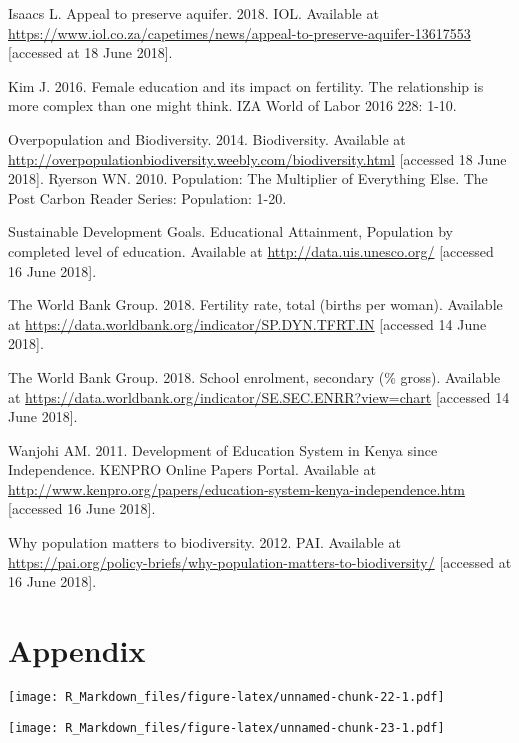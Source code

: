 \documentclass[11pt,]{article}
\begin{document}
Isaacs L. Appeal to preserve aquifer. 2018. IOL. Available at
\url{https://www.iol.co.za/capetimes/news/appeal-to-preserve-aquifer-13617553}
{[}accessed at 18 June 2018{]}.

Kim J. 2016. Female education and its impact on fertility. The
relationship is more complex than one might think. IZA World of Labor
2016 228: 1-10.

Overpopulation and Biodiversity. 2014. Biodiversity. Available at
\url{http://overpopulationbiodiversity.weebly.com/biodiversity.html}
{[}accessed 18 June 2018{]}. Ryerson WN. 2010. Population: The
Multiplier of Everything Else. The Post Carbon Reader Series:
Population: 1-20.

Sustainable Development Goals. Educational Attainment, Population by
completed level of education. Available at
\url{http://data.uis.unesco.org/} {[}accessed 16 June 2018{]}.

The World Bank Group. 2018. Fertility rate, total (births per woman).
Available at \url{https://data.worldbank.org/indicator/SP.DYN.TFRT.IN}
{[}accessed 14 June 2018{]}.

The World Bank Group. 2018. School enrolment, secondary (\% gross).
Available at
\url{https://data.worldbank.org/indicator/SE.SEC.ENRR?view=chart}
{[}accessed 14 June 2018{]}.

Wanjohi AM. 2011. Development of Education System in Kenya since
Independence. KENPRO Online Papers Portal. Available at
\url{http://www.kenpro.org/papers/education-system-kenya-independence.htm}
{[}accessed 16 June 2018{]}.

Why population matters to biodiversity. 2012. PAI. Available at
\url{https://pai.org/policy-briefs/why-population-matters-to-biodiversity/}
{[}accessed at 16 June 2018{]}.

\section{Appendix}\label{appendix}

\texttt{[image: R\_Markdown\_files/figure-latex/unnamed-chunk-22-1.pdf]}

\texttt{[image: R\_Markdown\_files/figure-latex/unnamed-chunk-23-1.pdf]}
\end{document}
